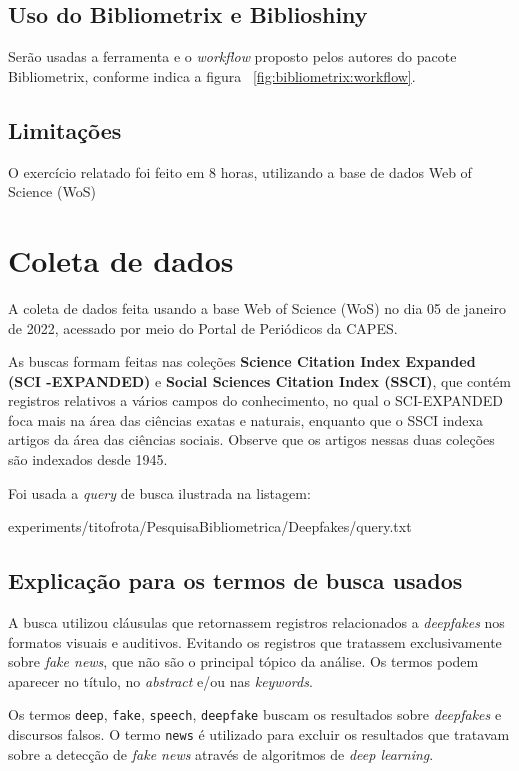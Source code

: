 \subsection{Uso do Bibliometrix e Biblioshiny}
Serão usadas a ferramenta e o \textit{workflow} proposto pelos autores do pacote Bibliometrix, conforme indica a figura ~\ref{fig:bibliometrix:workflow}.

\subsection{Limitações} O exercício relatado foi feito em 8 horas, utilizando a base de dados Web of Science (WoS)


\section{Coleta de dados\label{MASSA:coleta}}

A coleta de dados feita usando a base Web of Science (WoS) no dia 05 de janeiro de 2022, acessado por meio do Portal de Periódicos da CAPES.

As buscas formam feitas nas coleções \textbf{Science  Citation  Index  Expanded (SCI -EXPANDED)} e \textbf{Social  Sciences  Citation  Index (SSCI)}, que contém registros relativos a vários campos do conhecimento, no qual o SCI-EXPANDED foca mais na área das ciências exatas e naturais, enquanto que o SSCI indexa artigos da área das ciências sociais. Observe que os artigos nessas duas coleções são indexados desde 1945. 

Foi usada a \textit{query} de busca ilustrada na listagem:


{experiments/titofrota/PesquisaBibliometrica/Deepfakes/query.txt}

\subsection{Explicação para os termos de busca usados\label{sec:titofrota:query}}

A busca utilizou cláusulas que retornassem registros relacionados a \textit{deepfakes} nos formatos visuais e auditivos. Evitando os registros que tratassem exclusivamente sobre \textit{fake news}, que não são o principal tópico da análise. Os termos podem aparecer no título, no \textit{abstract} e/ou nas \textit{keywords}. 

Os termos \texttt{deep}, \texttt{fake}, \texttt{speech}, \texttt{deepfake} buscam os resultados sobre \textit{deepfakes} e discursos falsos. O termo \texttt{news} é utilizado para excluir os resultados que tratavam sobre a detecção de \textit{fake news} através de algoritmos de \textit{deep learning}.

